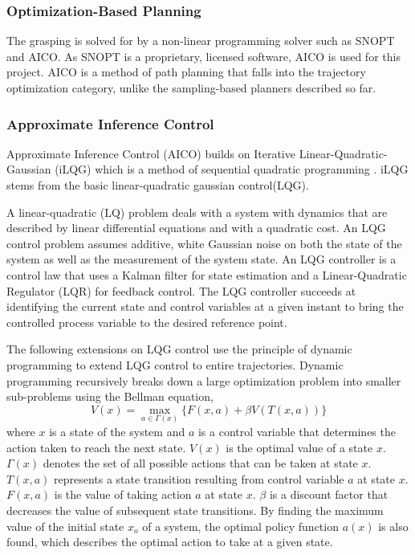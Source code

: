 \documentclass[12pt]{article}
\begin{document}
        \subsubsection{Optimization-Based Planning}
            The grasping is solved for by a non-linear programming solver such as SNOPT and AICO. As SNOPT is a proprietary, licensed software, AICO is used for this project. AICO is a method of path planning that falls into the trajectory optimization category, unlike the sampling-based planners described so far.

        \subsubsection{Approximate Inference Control}
            Approximate Inference Control (AICO) \cite{toussaint_robot_2009} builds on Iterative Linear-Quadratic-Gaussian (iLQG) which is a method of sequential quadratic programming \cite{todorov_generalized_2005}. iLQG stems from the basic linear-quadratic gaussian control(LQG).

            \par A linear-quadratic (LQ) problem deals with a system with dynamics that are described by linear differential equations and with a quadratic cost. An LQG control problem assumes additive, white Gaussian noise on both the state of the system as well as the measurement of the system state. An LQG controller is a control law that uses a Kalman filter for state estimation and a Linear-Quadratic Regulator (LQR) for feedback control. The LQG controller succeeds at identifying the current state and control variables at a given instant to bring the controlled process variable to the desired reference point.

            The following extensions on LQG control use the principle of dynamic programming to extend LQG control to entire trajectories. Dynamic programming recursively breaks down a large optimization problem into smaller sub-problems using the Bellman equation,
            \begin{equation}
                V(x)=\max_{a \in \Gamma (x)}\{F(x,a)+\beta V(T(x,a))\}
            \end{equation}
            where $x$ is a state of the system and $a$ is a control variable that determines the action taken to reach the next state. $V(x)$ is the optimal value of a state $x$. $\Gamma(x)$ denotes the set of all possible actions that can be taken at state $x$. $T(x,a)$ represents a state transition resulting from control variable $a$ at state $x$. $F(x,a)$ is the value of taking action $a$ at state $x$. $\beta$ is a discount factor that decreases the value of subsequent state transitions. By finding the maximum value of the initial state $x_{o}$ of a system, the optimal policy function $a(x)$ is also found, which describes the optimal action to take at a given state.
\end{document}
